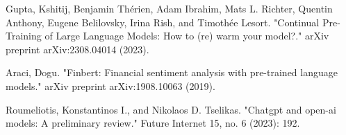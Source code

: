 \documentclass[runningheads]{llncs}
\begin{document}
\begin{thebibliography}{8}






Gupta, Kshitij, Benjamin Thérien, Adam Ibrahim, Mats L. Richter, Quentin Anthony, Eugene Belilovsky, Irina Rish, and Timothée Lesort. "Continual Pre-Training of Large Language Models: How to (re) warm your model?." arXiv preprint arXiv:2308.04014 (2023).



Araci, Dogu. "Finbert: Financial sentiment analysis with pre-trained language models." arXiv preprint arXiv:1908.10063 (2019).

Roumeliotis, Konstantinos I., and Nikolaos D. Tselikas. "Chatgpt and open-ai models: A preliminary review." Future Internet 15, no. 6 (2023): 192.


\end{thebibliography}
\end{document}
